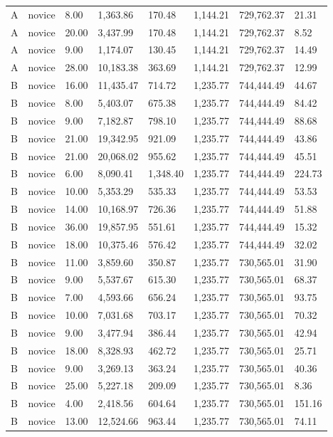 \documentclass[
  english,
  man,floatsintext]{apa6}
\begin{document}
\begin{table}[h]
\begin{center}
\begin{threeparttable}
{\begin{tabular}{llllllll}
A & novice & 8.00 & 1,363.86 & 170.48 & 1,144.21 & 729,762.37 & 21.31\\
A & novice & 20.00 & 3,437.99 & 170.48 & 1,144.21 & 729,762.37 & 8.52\\
A & novice & 9.00 & 1,174.07 & 130.45 & 1,144.21 & 729,762.37 & 14.49\\
A & novice & 28.00 & 10,183.38 & 363.69 & 1,144.21 & 729,762.37 & 12.99\\
B & novice & 16.00 & 11,435.47 & 714.72 & 1,235.77 & 744,444.49 & 44.67\\
B & novice & 8.00 & 5,403.07 & 675.38 & 1,235.77 & 744,444.49 & 84.42\\
B & novice & 9.00 & 7,182.87 & 798.10 & 1,235.77 & 744,444.49 & 88.68\\
B & novice & 21.00 & 19,342.95 & 921.09 & 1,235.77 & 744,444.49 & 43.86\\
B & novice & 21.00 & 20,068.02 & 955.62 & 1,235.77 & 744,444.49 & 45.51\\
B & novice & 6.00 & 8,090.41 & 1,348.40 & 1,235.77 & 744,444.49 & 224.73\\
B & novice & 10.00 & 5,353.29 & 535.33 & 1,235.77 & 744,444.49 & 53.53\\
B & novice & 14.00 & 10,168.97 & 726.36 & 1,235.77 & 744,444.49 & 51.88\\
B & novice & 36.00 & 19,857.95 & 551.61 & 1,235.77 & 744,444.49 & 15.32\\
B & novice & 18.00 & 10,375.46 & 576.42 & 1,235.77 & 744,444.49 & 32.02\\
B & novice & 11.00 & 3,859.60 & 350.87 & 1,235.77 & 730,565.01 & 31.90\\
B & novice & 9.00 & 5,537.67 & 615.30 & 1,235.77 & 730,565.01 & 68.37\\
B & novice & 7.00 & 4,593.66 & 656.24 & 1,235.77 & 730,565.01 & 93.75\\
B & novice & 10.00 & 7,031.68 & 703.17 & 1,235.77 & 730,565.01 & 70.32\\
B & novice & 9.00 & 3,477.94 & 386.44 & 1,235.77 & 730,565.01 & 42.94\\
B & novice & 18.00 & 8,328.93 & 462.72 & 1,235.77 & 730,565.01 & 25.71\\
B & novice & 9.00 & 3,269.13 & 363.24 & 1,235.77 & 730,565.01 & 40.36\\
B & novice & 25.00 & 5,227.18 & 209.09 & 1,235.77 & 730,565.01 & 8.36\\
B & novice & 4.00 & 2,418.56 & 604.64 & 1,235.77 & 730,565.01 & 151.16\\
B & novice & 13.00 & 12,524.66 & 963.44 & 1,235.77 & 730,565.01 & 74.11\\

\end{tabular}}
\end{threeparttable}
\end{center}
\end{table}
\end{document}
